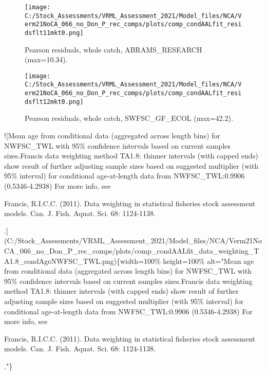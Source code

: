 \documentclass[11pt,
  english,
  a4paper,
]{article}
\begin{document}
\begin{figure}
\centering
\texttt{[image: C:/Stock\_Assessments/VRML\_Assessment\_2021/Model\_files/NCA/Verm21NoCA\_066\_no\_Don\_P\_rec\_comps/plots/comp\_condAALfit\_residsflt11mkt0.png]}
\caption{Pearson residuals, whole catch, ABRAMS\_RESEARCH (max=10.34).\label{fig:comp_condAALfit_residsflt11mkt0}}
\end{figure}

\begin{figure}
\centering
\texttt{[image: C:/Stock\_Assessments/VRML\_Assessment\_2021/Model\_files/NCA/Verm21NoCA\_066\_no\_Don\_P\_rec\_comps/plots/comp\_condAALfit\_residsflt12mkt0.png]}
\caption{Pearson residuals, whole catch, SWFSC\_GF\_ECOL (max=42.2).\label{fig:comp_condAALfit_residsflt12mkt0}}
\end{figure}

!{[}Mean age from conditional data (aggregated across length bins) for NWFSC\_TWL with 95\% confidence intervals based on current samples sizes.Francis data weighting method TA1.8: thinner intervals (with capped ends) show result of further adjusting sample sizes based on suggested multiplier (with 95\% interval) for conditional age-at-length data from NWFSC\_TWL:0.9906 (0.5346-4.2938) For more info, see

Francis, R.I.C.C. (2011). Data weighting in statistical fisheries stock assessment models. Can. J. Fish. Aquat. Sci. 68: 1124-1138.

.\label{fig:comp_condAALfit_data_weighting_TA1.8_condAgeNWFSC_TWL}{]}(C:/Stock\_Assessments/VRML\_Assessment\_2021/Model\_files/NCA/Verm21NoCA\_066\_no\_Don\_P\_rec\_comps/plots/comp\_condAALfit\_data\_weighting\_TA1.8\_condAgeNWFSC\_TWL.png)\{width=100\% height=100\% alt="Mean age from conditional data (aggregated across length bins) for NWFSC\_TWL with 95\% confidence intervals based on current samples sizes.Francis data weighting method TA1.8: thinner intervals (with capped ends) show result of further adjusting sample sizes based on suggested multiplier (with 95\% interval) for conditional age-at-length data from NWFSC\_TWL:0.9906 (0.5346-4.2938) For more info, see

Francis, R.I.C.C. (2011). Data weighting in statistical fisheries stock assessment models. Can. J. Fish. Aquat. Sci. 68: 1124-1138.

."\}
\end{document}
